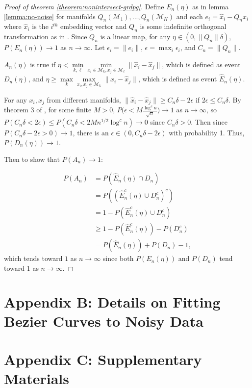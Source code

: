 \documentclass[
  11pt,
]{article}
\theoremstyle{definition}
\theoremstyle{definition}
\theoremstyle{definition}
\theoremstyle{definition}
\theoremstyle{remark}
\begin{document}
\begin{proof}[Proof of theorem \ref{theorem:nonintersect-grdpg}]
Define $E_n(\eta)$ as in lemma \ref{lemma:no-noise} for manifolds $Q_n(\mathcal{M}_1), ..., Q_n(\mathcal{M}_K)$ and each $e_i = \hat{x}_i - Q_n x_i$ where $\hat{x}_i$ is the $i^{th}$ embedding vector and $Q_n$ is some indefinite orthogonal transformation as in \citet{rubindelanchy2017statistical}. 
Since $Q_n$ is a linear map, for any $\eta \in (0, \|Q_n\| \delta)$, $P(E_n(\eta)) \to 1$ as $n \to \infty$. 
Let $\epsilon_i = \|e_i\|$, $\epsilon = \max_i \epsilon_i$, and $C_n = \|Q_n\|$. 

$A_n(\eta)$ is true if $\eta < \min\limits_{k, \ell} \min\limits_{x_i \in \mathcal{M}_k, x_j \in \mathcal{M}_\ell} \|\hat{x}_i - \hat{x}_j\|$, which is defined as event $D_n(\eta)$, and $\eta \geq \max\limits_k \max\limits_{x_i, x_j \in \mathcal{M}_k} \|\hat{x}_i - \hat{x}_j\|$, which is defined as event $\hat{E}_n(\eta)$.

For any $x_i, x_j$ from different manifolds, $\|\hat{x}_i - \hat{x}_j\| \geq C_n \delta - 2 \epsilon$ if $2 \epsilon \leq C_n \delta$. 
By theorem 3 of \citet{rubindelanchy2017statistical}, for some finite $M > 0$, $P \big(\epsilon < M \frac{\log^c n}{\sqrt{n}} \big) \to 1$ as $n \to \infty$, so $P(C_n \delta < 2 \epsilon) \leq P(C_n \delta < 2 M n^{1/2} \log^c n) \to 0$ since $C_n \delta > 0$. 
Then since $P(C_n \delta - 2 \epsilon > 0) \to 1$, there is an $\epsilon \in (0, C_n \delta - 2 \epsilon)$ with probability 1. 
Thus, $P(D_n(\eta)) \to 1$. 



Then to show that $P(A_n) \to 1$: 

$$
\begin{aligned}
P(A_n) & = P(\hat{E}_n(\eta) \cap D_n) \\
& = P((\hat{E}_n^c(\eta) \cup D_n^c)^c) \\
& = 1 - P(\hat{E}_n^c(\eta) \cup D_n^c) \\
& \geq 1 - P(\hat{E}_n^c(\eta)) - P(D_n^c) \\ 
& = P(\hat{E}_n(\eta)) + P(D_n) - 1,
\end{aligned}
$$
which tends toward $1$ as $n \to \infty$ since both $P(E_n(\eta))$ and $P(D_n)$ tend toward $1$ as $n \to \infty$. 
\end{proof}

\newpage

\section*{Appendix B: Details on Fitting Bezier Curves to Noisy Data}

\newpage

\section*{Appendix C: Supplementary Materials}

\newpage

\renewcommand\refname{References}
  
\end{document}

